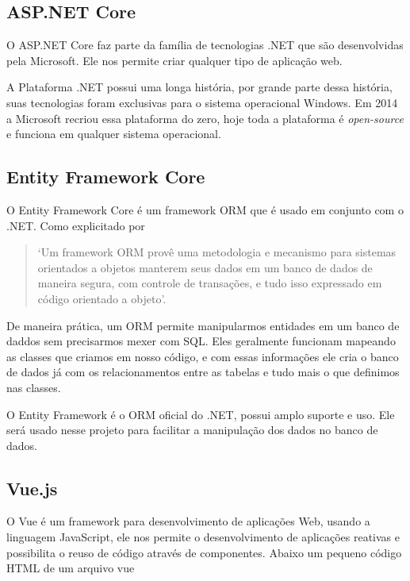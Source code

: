 \documentclass[12pt]{article}
\begin{document}
\subsection{ASP.NET Core}

O ASP.NET Core faz parte da família de tecnologias .NET que são desenvolvidas pela Microsoft.
Ele nos permite criar qualquer tipo de aplicação web.

A Plataforma .NET possui uma longa história, por grande parte dessa história, suas
tecnologias foram exclusivas para o sistema operacional Windows. Em 2014 a Microsoft recriou
essa plataforma do zero, hoje toda a plataforma é \textit{open-source} e funciona em qualquer
sistema operacional.

\subsection{Entity Framework Core}

O Entity Framework Core é um framework ORM que é usado em conjunto com o .NET.
Como explicitado por~\cite{ormHibernate}

\begin{quote}
  `Um framework ORM provê uma metodologia e mecanismo
  para sistemas orientados a objetos manterem seus dados em um banco de dados de maneira
  segura, com controle de transações, e tudo isso expressado em código orientado a objeto'.
\end{quote}

De maneira prática, um ORM permite manipularmos entidades em um banco de daddos
sem precisarmos mexer com SQL. Eles geralmente funcionam mapeando as classes
que criamos em nosso código, e com essas informações ele cria o banco de dados já com os relacionamentos
entre as tabelas e tudo mais o que definimos nas classes.

O Entity Framework é o ORM oficial do .NET, possui amplo suporte e uso. Ele será
usado nesse projeto para facilitar a manipulação dos dados no banco de dados.

\subsection{Vue.js}

O Vue é um framework para desenvolvimento de aplicações Web, usando a linguagem JavaScript,
ele nos permite o desenvolvimento de aplicações reativas e possibilita o reuso
de código através de componentes. Abaixo um pequeno código HTML de um arquivo vue
\end{document}
